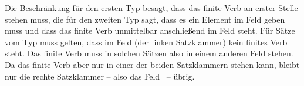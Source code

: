 \ex\label{v2-clause-type}  \impl {}
\ex\label{subord-clause-types}  \impl {}
\zl
Die Beschränkung für den ersten Typ besagt, dass das finite Verb an erster Stelle stehen muss,
die für den zweiten Typ sagt, dass es ein Element im Feld  geben muss und dass das
finite Verb unmittelbar anschließend im Feld  steht. Für Sätze vom Typ
 muss gelten, dass im Feld  (der linken Satzklammer) kein finites
Verb steht. Das finite Verb muss in solchen Sätzen also in einem anderen Feld stehen. Da das
finite Verb aber nur in einer der beiden Satzklammern stehen kann, bleibt nur die rechte Satzklammer
-- also das Feld~ -- übrig.

